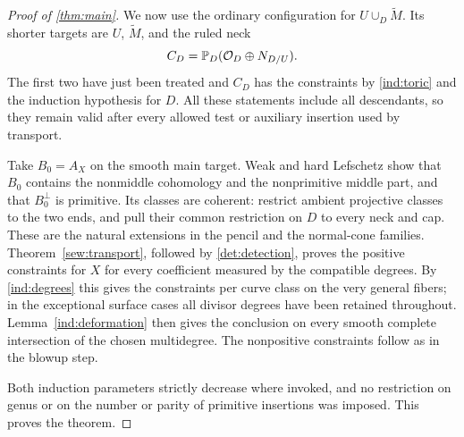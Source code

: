 \begin{proof}[Proof of \cref{thm:main}]
We now use the ordinary configuration for
$U\cup_D\widetilde M$. Its shorter targets are $U$, $\widetilde M$,
and the ruled neck
\[
 C_D=\mathbb P_D(\mathcal O_D\oplus N_{D/U}).
\]
The first two have just been treated and $C_D$ has the constraints by
\cref{ind:toric} and the induction hypothesis for $D$. All these
statements include all descendants, so they remain valid after every
allowed test or auxiliary insertion used by transport.

Take $B_0=A_X$ on the smooth main target. Weak and hard Lefschetz show
that $B_0$ contains the nonmiddle cohomology and the nonprimitive
middle part, and that $B_0^\perp$ is primitive. Its classes are
coherent: restrict ambient projective classes to the two ends, and
pull their common restriction on $D$ to every neck and cap. These are
the natural extensions in the pencil and the normal-cone families.
Theorem~\ref{sew:transport}, followed by \cref{det:detection}, proves
the positive constraints for $X$ for every coefficient measured by
the compatible degrees. By \cref{ind:degrees} this gives the
constraints per curve class on the very general fibers; in the
exceptional surface cases all divisor degrees have been retained
throughout. Lemma~\ref{ind:deformation} then gives the conclusion
on every smooth complete intersection of the chosen multidegree.
The nonpositive constraints follow as in the blowup step.

Both induction parameters strictly decrease where invoked, and no
restriction on genus or on the number or parity of primitive
insertions was imposed. This proves the theorem.
\end{proof}
